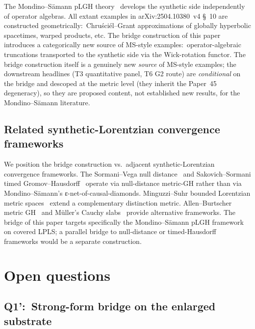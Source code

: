 \documentclass[11pt,a4paper]{article}
\theoremstyle{plain}
\theoremstyle{definition}
\begin{document}
The Mondino--S\"amann pLGH theory~\cite{mondino_samann2025_pointed}
develops the synthetic side independently of operator algebras. All
extant examples in arXiv:2504.10380~v4 \S~10 are constructed
geometrically:\ Chruści\'el--Grant approximations of globally
hyperbolic spacetimes, warped products, etc. The bridge construction
of this paper introduces a categorically new source of MS-style
examples:\ operator-algebraic truncations transported to the synthetic
side via the Wick-rotation functor. The bridge construction itself is
a genuinely new \emph{source} of MS-style examples; the downstream
headlines (T3 quantitative panel, T6 G2 route) are \emph{conditional}
on the bridge and descoped at the metric level (they inherit the
Paper~45 degeneracy), so they are proposed content, not established
new results, for the Mondino--S\"amann literature.

\subsection{Related synthetic-Lorentzian convergence
frameworks}\label{sec:related_syn_lor}

We position the bridge construction vs.\ adjacent synthetic-Lorentzian
convergence frameworks. The Sormani--Vega null
distance~\cite{sormani_vega2016} and Sakovich--Sormani timed
Gromov--Hausdorff~\cite{sakovich_sormani2024} operate via null-distance
metric-GH rather than via Mondino--S\"amann's
ε-net-of-causal-diamonds. Minguzzi--Suhr bounded Lorentzian metric
spaces~\cite{minguzzi_suhr2024} extend a complementary distinction
metric. Allen--Burtscher metric GH~\cite{allen_burtscher2022} and
M\"uller's Cauchy slabs~\cite{muller2022} provide alternative
frameworks. The bridge of this paper targets specifically the
Mondino--S\"amann pLGH framework on covered LPLS; a parallel bridge to
null-distance or timed-Hausdorff frameworks would be a separate
construction.

\section{Open questions}\label{sec:open_questions}

\subsection{Q1':\ Strong-form bridge on the enlarged
substrate}\label{sec:open_q1prime}
\end{document}
